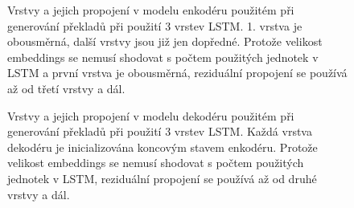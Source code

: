 \begin{figure}[H]
    \begin{center}
    \end{center}
	\caption{Vrstvy a jejich propojení v modelu enkodéru použitém při generování překladů při použití 3 vrstev LSTM. 1. vrstva je obousměrná, další vrstvy jsou již jen dopředné. Protože velikost embeddings se nemusí shodovat s počtem použitých jednotek v LSTM a první vrstva je obousměrná, reziduální propojení se používá až od třetí vrstvy a dál.}
	\label{img:encodermodel}
\end{figure}

\begin{figure}[H]
    \begin{center}
    \end{center}
	\caption{Vrstvy a jejich propojení v modelu dekodéru použitém při generování překladů při použití 3 vrstev LSTM. Každá vrstva dekodéru je inicializována koncovým stavem enkodéru. Protože velikost embeddings se nemusí shodovat s počtem použitých jednotek v LSTM, reziduální propojení se používá až od druhé vrstvy a dál.}
	\label{img:decodermodel}
\end{figure}


